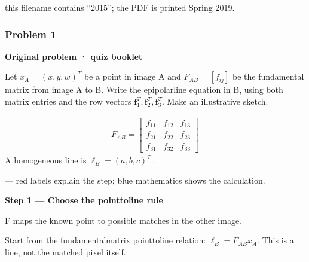 \documentclass[letterpaper,11pt,english,openany,oneside]{jupyterBook}
\begin{document}
\sphinxAtStartPar
{} this filename contains “2015”; the PDF is printed Spring 2019.


\subsubsection{Problem 1}
\label{\detokenize{lectures/lecture04/quiz-workbook:problem-1}}\label{\detokenize{lectures/lecture04/quiz-workbook:quiz-1-q1}}\label{\detokenize{lectures/lecture04/quiz-workbook:ex-lec04-symbolic}}
\par\medskip\textbf{Original problem · quiz booklet}\par\smallskip

\sphinxAtStartPar
Let \(x_A=(x,y,w)^T\) be a point in image A and \(F_{AB}=[f_{ij}]\) be the fundamental matrix from image A to B. Write the epipolar\sphinxhyphen{}line equation in B, using both matrix entries and the row vectors \(\mathbf f_1^T,\mathbf f_2^T,\mathbf f_3^T\). Make an illustrative sketch.

\par\medskip

\sphinxAtStartPar
{}
\begin{equation*}
\begin{split}
F_{AB}=\begin{bmatrix}f_{11}&f_{12}&f_{13}\\f_{21}&f_{22}&f_{23}\\f_{31}&f_{32}&f_{33}\end{bmatrix}
\end{split}
\end{equation*}
\sphinxAtStartPar
A homogeneous line is \(\ell_B=(a,b,c)^T\).

\sphinxAtStartPar
{} — red labels explain the step; blue mathematics shows the calculation.

\par\medskip{}
{\color{QuizStepRed}\bfseries Step 1 — Choose the point\sphinxhyphen{}to\sphinxhyphen{}line rule}\par\smallskip

\sphinxAtStartPar
{} F maps the known point to possible matches in the other image.

\sphinxAtStartPar
Start from the fundamental\sphinxhyphen{}matrix point\sphinxhyphen{}to\sphinxhyphen{}line relation: {\color{QuizMathBlue} \(\ell_B=F_{AB}x_A\)}. This is a line, not the matched pixel itself.
\end{document}
